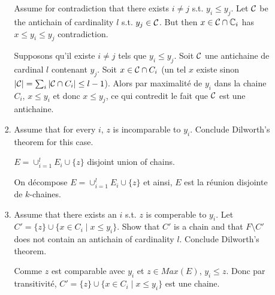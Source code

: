 \documentclass[a4paper,11pt]{exam}
\newcommand{\C}{\mathbb{C}}
\begin{document}
\begin{questions}
\begin{enumerate}[resume]
\begin{enumerate}
\begin{enumerate}
					\begin{solution}
						Assume for contradiction that there exists $i \neq j$ s.t. $y_i \leq y_j$.
						Let $\mathcal{C}$ be the antichain of cardinality $l$ s.t. $y_j\in\mathcal{C}$. But then $x\in\CC\cap\C_i$ has $x\leq y_i\leq y_j$ contradiction.
						
						Supposons qu'il existe $i \neq j$ tels que $y_i \leq y_j$.
						Soit $\mathcal{C}$ une antichaine de cardinal $l$ contenant $y_j$.
						Soit $x \in \mathcal{C} \cap C_i$ (un tel $x$ existe sinon $|\mathcal{C}| =
						\sum_i |\mathcal{C} \cap C_i| \leq l-1$).
						Alors par maximalité de $y_i$ dans la chaine $C_i$,
						$x \leq y_i$ et donc $x \leq y_j$, ce qui contredit le fait que
						$\mathcal{C}$ est une antichaine.
					\end{solution}
					
					\item Assume that for every $i$, $z$ is incomparable to 	$y_i$. Conclude Dilworth's theorem for this case.
					
					\begin{solution}
						$E = \cup_{i=1}^l E_i \cup \{z\}$ disjoint union of chains.
						
						On décompose $E = \cup_{i=1}^l E_i \cup \{z\}$ et ainsi, $E$
						est la réunion disjointe de $k$-chaines.
					\end{solution}
					
					\item Assume that there exists an $i$ s.t. $z$ is comperable to $y_i$. Let $C' = \{z\}\cup \{x\in C_i \; | \; x \leq y_i\}$.
					Show that $C'$ is a chain and that $F \setminus C'$ does not contain an antichain of cardinality $l$.
					Conclude Dilworth's theorem.
					
					\begin{solution}
						Comme $z$ est comparable avec $y_i$ et $z \in Max(E)$,
						$y_i \leq z$. 
						Donc par transitivité,
						$C' = \{z\} \cup \{ x \in C_i \mid x \leq y_i \}$
						est une chaine.
						

\end{solution}
\end{enumerate}
\end{enumerate}
\end{enumerate}
\end{questions}
\end{document}

